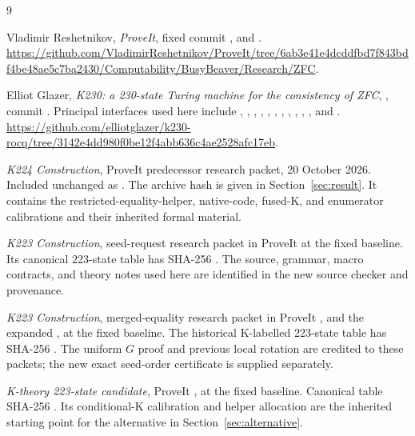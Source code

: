 \clearpage
\begin{thebibliography}{9}
\raggedright
{}
Vladimir Reshetnikov, \emph{ProveIt}, fixed commit
,
 and .
\url{https://github.com/VladimirReshetnikov/ProveIt/tree/6ab3e41e4dcddfbd7f843bdf4be48ae5c7ba2430/Computability/BusyBeaver/Research/ZFC}.

Elliot Glazer, \emph{K230: a 230-state Turing machine for the consistency
of ZFC}, , commit
.
Principal interfaces used here include ,
, , ,
, , ,
, , ,
, and .
\url{https://github.com/elliotglazer/k230-rocq/tree/3142e4dd980f0be12f4abb636c4ae2528afc17eb}.

\emph{K224 Construction}, ProveIt predecessor research packet,
20 October 2026. Included unchanged as
.
The archive hash is given in Section~\ref{sec:result}. It contains
the restricted-equality-helper, native-code, fused-K, and enumerator
calibrations and their inherited formal material.

\emph{K223 Construction}, seed-request research packet in ProveIt
 at the fixed
baseline. Its canonical 223-state table has SHA-256
.
The source, grammar, macro contracts, and theory notes used here are
identified in the new source checker and provenance.

\emph{K223 Construction}, merged-equality research packet in ProveIt
, and the
expanded , at the fixed
baseline. The historical K-labelled 223-state table has SHA-256
.
The uniform $G$ proof and previous local rotation are credited to these
packets; the new exact seed-order certificate is supplied separately.

\emph{K-theory 223-state candidate}, ProveIt
, at the
fixed baseline. Canonical table SHA-256
.
Its conditional-K calibration and helper allocation are the inherited
starting point for the alternative in Section~\ref{sec:alternative}.
\end{thebibliography}
